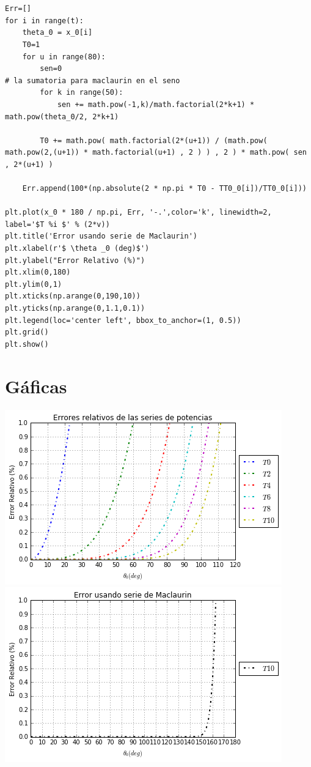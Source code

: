 \documentclass[11pt,spanish]{article}
\begin{document}
\begin{lstlisting}[caption=Segmento de código para la serie de Maclaurin]


Err=[]
for i in range(t):
    theta_0 = x_0[i]
    T0=1
    for u in range(80):
        sen=0
# la sumatoria para maclaurin en el seno
        for k in range(50):
            sen += math.pow(-1,k)/math.factorial(2*k+1) * math.pow(theta_0/2, 2*k+1)
            
        T0 += math.pow( math.factorial(2*(u+1)) / (math.pow( math.pow(2,(u+1)) * math.factorial(u+1) , 2 ) ) , 2 ) * math.pow( sen , 2*(u+1) )   
    
    Err.append(100*(np.absolute(2 * np.pi * T0 - TT0_0[i])/TT0_0[i]))

plt.plot(x_0 * 180 / np.pi, Err, '-.',color='k', linewidth=2, label='$T %i $' % (2*v))
plt.title('Error usando serie de Maclaurin')
plt.xlabel(r'$ \theta _0 (deg)$')
plt.ylabel("Error Relativo (%)")
plt.xlim(0,180)
plt.ylim(0,1)
plt.xticks(np.arange(0,190,10))
plt.yticks(np.arange(0,1.1,0.1))
plt.legend(loc='center left', bbox_to_anchor=(1, 0.5))
plt.grid()
plt.show()

\end{lstlisting}

\section*{Gáficas}

\centering

\includegraphics[scale=1]{err}\\
\includegraphics[scale=1]{mac}\\
\end{document}
